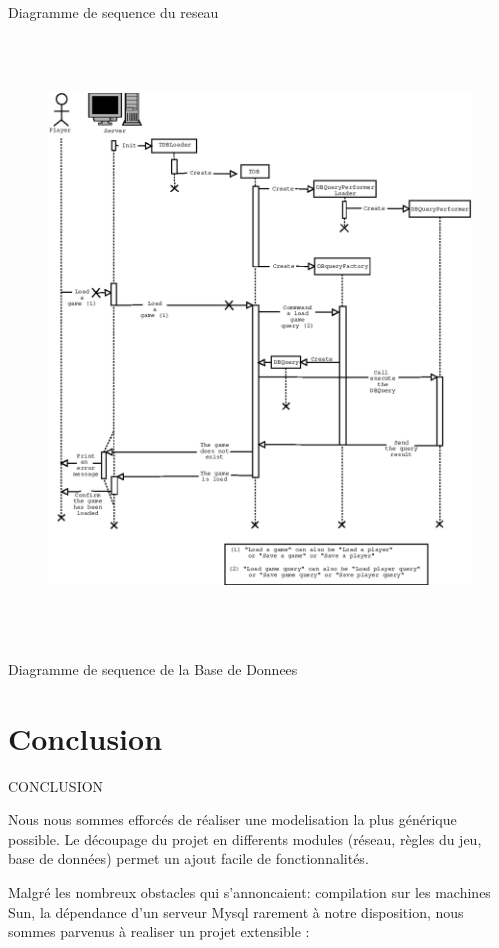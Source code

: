 \documentclass[french,12pt]{report}
\begin{document}
\begin{center}
Diagramme de sequence du reseau

\pagebreak

\begin{figure}[h]
\includegraphics[height=16cm]{DSequenceBD.eps}
\end{figure}

Diagramme de sequence de la Base de Donnees

\end{center}

\pagebreak
	
\section*{Conclusion}
{\uppercase{Conclusion}}

Nous nous sommes efforc\'es de r\'ealiser une modelisation la plus g\'en\'erique possible.
Le d\'ecoupage du projet en differents modules (r\'eseau, r\`egles du jeu, base de donn\'ees) permet un ajout facile de fonctionnalit\'es.


Malgr\'e les nombreux obstacles qui s'annoncaient: compilation sur les machines Sun, la d\'ependance d'un serveur Mysql rarement \`a notre disposition, nous sommes parvenus \`a realiser un projet extensible :
\end{document}
